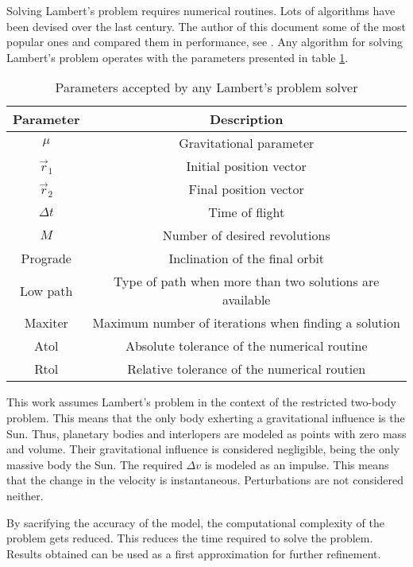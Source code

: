 Solving Lambert's problem requires numerical routines. Lots of algorithms have
been devised over the last century. The author of this document some of the most
popular ones and compared them in performance, see \cite{martinez2021}. Any
algorithm for solving Lambert's problem operates with the parameters presented
in table \ref{tab:lambert-parameters}.

\vspace{1cm}
\begin{table}[H]
  \centering
  \begin{tabular}{|c|c|}
    \hline
    Parameter   & Description                                             \\
    \hline
    $\mu$       & Gravitational parameter                                 \\
    $\vec{r}_1$ & Initial position vector                                 \\
    $\vec{r}_2$ & Final position vector                                   \\
    $\Delta t$  & Time of flight                                          \\
    $M$         & Number of desired revolutions                           \\
    Prograde    & Inclination of the final orbit                          \\
    Low path    & Type of path when more than two solutions are available \\
    Maxiter     & Maximum number of iterations when finding a solution    \\
    Atol        & Absolute tolerance of the numerical routine             \\
    Rtol        & Relative tolerance of the numerical routien             \\
    \hline
  \end{tabular}
  \caption{Parameters accepted by any Lambert's problem solver}
  \label{tab:lambert-parameters}
\end{table}

This work assumes Lambert's problem in the context of the restricted two-body
problem. This means that the only body exherting a gravitational influence is
the Sun. Thus, planetary bodies and interlopers are modeled as points with zero
mass and volume. Their gravitational influence is considered negligible, being
the only massive body the Sun. The required $\Delta v$ is modeled as an impulse.
This means that the change in the velocity is instantaneous. Perturbations are
not considered neither.

By sacrifying the accuracy of the model, the computational complexity of the
problem gets reduced. This reduces the time required to solve the problem.
Results obtained can be used as a first approximation for further refinement.
